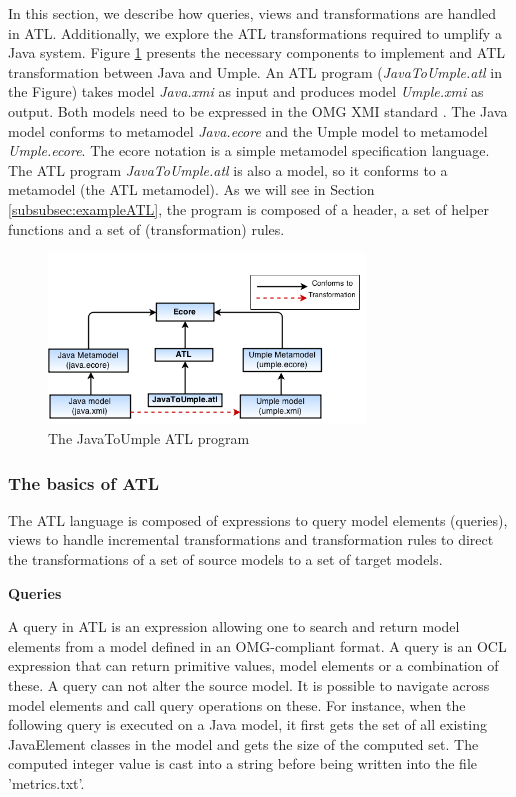 In this section, we describe how queries, views and transformations are handled in ATL. Additionally, we explore the ATL transformations required to umplify a Java system. Figure \ref{fig:atl} presents the necessary components to implement and ATL transformation between Java and Umple. An ATL program (\textit{JavaToUmple.atl} in the Figure) takes model \textit{Java.xmi} as input and produces model \textit{Umple.xmi} as output. Both models need to be expressed in the OMG XMI standard \cite{xmispec}. The Java model conforms to metamodel \textit{Java.ecore} and the Umple model to metamodel \textit{Umple.ecore}. The ecore \cite{ecore} notation is a simple metamodel specification language. The ATL program \textit{JavaToUmple.atl} is also a model, so it conforms to a metamodel (the ATL metamodel). As we will see in Section \ref{subsubsec:exampleATL}, the program is composed of a header, a set of helper functions and a set of (transformation) rules.

\begin{figure}[h]
\centering
\includegraphics[width=0.75\textwidth]{Figures/ATL_PROGRAM.png} 
\caption{The JavaToUmple ATL program}
\label{fig:atl}
\end{figure}


\subsubsection{The basics of ATL}

The ATL language is composed of expressions to query model elements (queries), views to handle incremental transformations and transformation rules to direct the transformations of  a set of source models to a set of target models.

\textbf{Queries}

A query in ATL is an expression allowing one to search and return model elements from a model defined in an OMG-compliant format. A query is an OCL expression that can return primitive values, model elements or a combination of these. A query can not alter the source model. It is possible to navigate across model elements and call query operations on these. For instance, when the following query is executed on a Java model, it first gets the set of all existing JavaElement classes in the model and gets the size of the computed set. The computed integer value is cast into a string before being written into the file 'metrics.txt'. 

